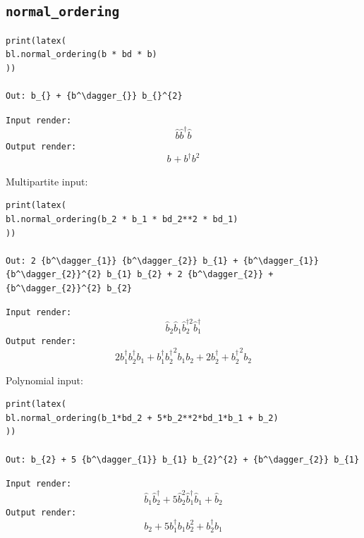 \documentclass[5p, twocolumn, 10pt, sort&compress]{elsarticle}
\newcommand{\inlinecode}[1]{\texttt{#1}}
\newcommand{\bop}{\hat{b}}
\newcommand{\bdag}{\bop^\dagger}
\newcommand{\bdagn}[1]{\bop^{\dagger {#1}}}
\newenvironment{revision2}{%
\color{red}
}
{}
\begin{document}
\subsection{\inlinecode{normal_ordering}}

\begin{verbatim}
print(latex(
bl.normal_ordering(b * bd * b)
))

Out: b_{} + {b^\dagger_{}} b_{}^{2}
\end{verbatim}
\begin{revision2}
\inlinecode{Input render:}
\begin{equation*}
    \bop\bdag\bop
\end{equation*}
\noindent\noindent\inlinecode{Output render:}
\begin{equation*}
    b_{} + {b^\dagger_{}} b_{}^{2}
\end{equation*}
\end{revision2}

\noindent Multipartite input:
\begin{verbatim}
print(latex(
bl.normal_ordering(b_2 * b_1 * bd_2**2 * bd_1)
))

Out: 2 {b^\dagger_{1}} {b^\dagger_{2}} b_{1} + {b^\dagger_{1}} {b^\dagger_{2}}^{2} b_{1} b_{2} + 2 {b^\dagger_{2}} + {b^\dagger_{2}}^{2} b_{2}
\end{verbatim}
\begin{revision2}
\noindent\inlinecode{Input render:}
\begin{equation*}
    \bop_2\bop_1\bdagn{2}_2\bdag_1
\end{equation*}
\noindent\inlinecode{Output render:}
\begin{equation*}
    2 {b^\dagger_{1}} {b^\dagger_{2}} b_{1} + {b^\dagger_{1}} {b^\dagger_{2}}^{2} b_{1} b_{2} + 2 {b^\dagger_{2}} + {b^\dagger_{2}}^{2} b_{2}
\end{equation*}
\end{revision2}

\noindent Polynomial input:
\begin{verbatim}
print(latex(
bl.normal_ordering(b_1*bd_2 + 5*b_2**2*bd_1*b_1 + b_2)
))

Out: b_{2} + 5 {b^\dagger_{1}} b_{1} b_{2}^{2} + {b^\dagger_{2}} b_{1}
\end{verbatim}
\begin{revision2}
\inlinecode{Input render:}
\begin{equation*}
    \bop_1 \bdag_2 + 5\bop_2^2 \bdag_1\bop_1 + \bop_2
\end{equation*}
\noindent\inlinecode{Output render:}
\begin{equation*}
    b_{2} + 5 {b^\dagger_{1}} b_{1} b_{2}^{2} + {b^\dagger_{2}} b_{1}
\end{equation*}
\end{revision2}
\end{document}
